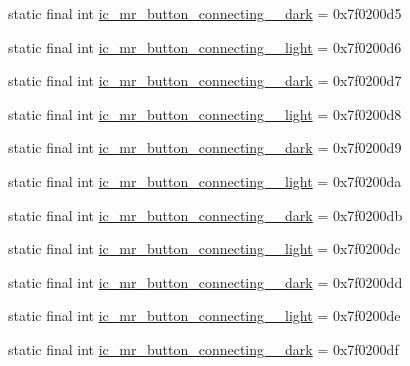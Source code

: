 \begin{CompactItemize}
\item 
static final int \hyperlink{classandroid_1_1support_1_1v7_1_1recyclerview_1_1_r_1_1drawable_17387d03ae168b1fd5c7cdffad764c64}{ic\_\-mr\_\-button\_\-connecting\_\_\-dark} = 0x7f0200d5
\item 
static final int \hyperlink{classandroid_1_1support_1_1v7_1_1recyclerview_1_1_r_1_1drawable_d22cc89b42aeb7471046e86e96b75399}{ic\_\-mr\_\-button\_\-connecting\_\_\-light} = 0x7f0200d6
\item 
static final int \hyperlink{classandroid_1_1support_1_1v7_1_1recyclerview_1_1_r_1_1drawable_653e5fe0d363d29dbd72f5734c3a10da}{ic\_\-mr\_\-button\_\-connecting\_\_\-dark} = 0x7f0200d7
\item 
static final int \hyperlink{classandroid_1_1support_1_1v7_1_1recyclerview_1_1_r_1_1drawable_2bfca0e8c07ac070482eb4bad6be53e4}{ic\_\-mr\_\-button\_\-connecting\_\_\-light} = 0x7f0200d8
\item 
static final int \hyperlink{classandroid_1_1support_1_1v7_1_1recyclerview_1_1_r_1_1drawable_dce205df2b57cefa8bb6df8f3065e99d}{ic\_\-mr\_\-button\_\-connecting\_\_\-dark} = 0x7f0200d9
\item 
static final int \hyperlink{classandroid_1_1support_1_1v7_1_1recyclerview_1_1_r_1_1drawable_9781164b20ec0a734101c170639f66e5}{ic\_\-mr\_\-button\_\-connecting\_\_\-light} = 0x7f0200da
\item 
static final int \hyperlink{classandroid_1_1support_1_1v7_1_1recyclerview_1_1_r_1_1drawable_69b6205fe1ca983189ea048b5b113656}{ic\_\-mr\_\-button\_\-connecting\_\_\-dark} = 0x7f0200db
\item 
static final int \hyperlink{classandroid_1_1support_1_1v7_1_1recyclerview_1_1_r_1_1drawable_eac4abe51c4d1783701cea9cf89520b2}{ic\_\-mr\_\-button\_\-connecting\_\_\-light} = 0x7f0200dc
\item 
static final int \hyperlink{classandroid_1_1support_1_1v7_1_1recyclerview_1_1_r_1_1drawable_bd27e14571ae3ef4d4bd6eb6bfcc984d}{ic\_\-mr\_\-button\_\-connecting\_\_\-dark} = 0x7f0200dd
\item 
static final int \hyperlink{classandroid_1_1support_1_1v7_1_1recyclerview_1_1_r_1_1drawable_336fc3eaa75eca03123431ad01d9860f}{ic\_\-mr\_\-button\_\-connecting\_\_\-light} = 0x7f0200de
\item 
static final int \hyperlink{classandroid_1_1support_1_1v7_1_1recyclerview_1_1_r_1_1drawable_36e7eee61c886ba374e9acabc2b69061}{ic\_\-mr\_\-button\_\-connecting\_\_\-dark} = 0x7f0200df
\item 

\end{CompactItemize}
